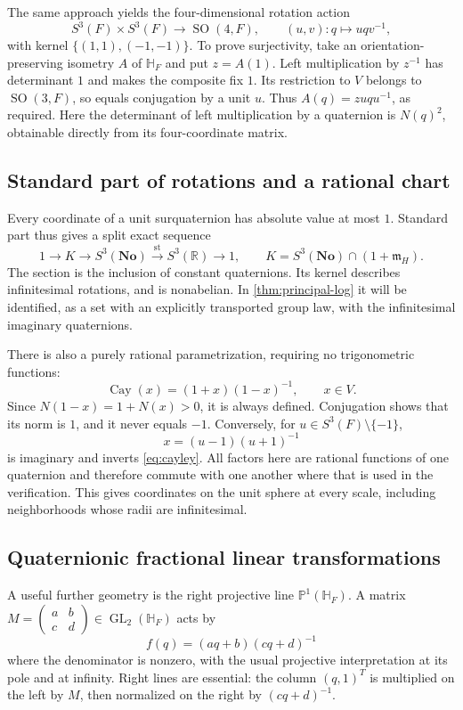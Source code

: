 \documentclass[11pt,letterpaper]{article}
\numberwithin{equation}{section}
\theoremstyle{definition}
\theoremstyle{remark}
\newcommand{\No}{\mathbf{No}}
\newcommand{\HF}{\mathbb H_F}
\newcommand{\R}{\mathbb R}
\newcommand{\mm}{\mathfrak m}
\newcommand{\st}{\operatorname{st}}
\newcommand{\GL}{\operatorname{GL}}
\newcommand{\SO}{\operatorname{SO}}
\begin{document}
The same approach yields the four-dimensional rotation action
\begin{equation}\label{eq:spin4}
 S^3(F)\times S^3(F)\longrightarrow\SO(4,F),\qquad
 (u,v):q\longmapsto uqv^{-1},
\end{equation}
with kernel $\{(1,1),(-1,-1)\}$. To prove surjectivity, take an orientation-preserving
isometry $A$ of $\HF$ and put $z=A(1)$. Left multiplication by $z^{-1}$ has determinant $1$
and makes the composite fix $1$. Its restriction to $V$ belongs to $\SO(3,F)$, so equals
conjugation by a unit $u$. Thus $A(q)=zuqu^{-1}$, as required. Here the determinant of left
multiplication by a quaternion is $N(q)^2$, obtainable directly from its four-coordinate
matrix.

\subsection{Standard part of rotations and a rational chart}
Every coordinate of a unit surquaternion has absolute value at most $1$. Standard part thus
gives a split exact sequence
\begin{equation}\label{eq:unitsreduction}
 1\longrightarrow K\longrightarrow S^3(\No)
 \xrightarrow{\st} S^3(\R)\longrightarrow1,
 \qquad K=S^3(\No)\cap(1+\mm_H).
\end{equation}
The section is the inclusion of constant quaternions. Its kernel describes infinitesimal
rotations, and is nonabelian. In \cref{thm:principal-log} it will be identified, as a set with
an explicitly transported group law, with the infinitesimal imaginary quaternions.

There is also a purely rational parametrization, requiring no trigonometric functions:
\begin{equation}\label{eq:cayley}
 \operatorname{Cay}(x)=(1+x)(1-x)^{-1},\qquad x\in V.
\end{equation}
Since $N(1-x)=1+N(x)>0$, it is always defined. Conjugation shows that its norm is $1$, and
it never equals $-1$. Conversely, for $u\in S^3(F)\setminus\{-1\}$,
\[
 x=(u-1)(u+1)^{-1}
\]
is imaginary and inverts \eqref{eq:cayley}. All factors here are rational functions of one
quaternion and therefore commute with one another where that is used in the verification.
This gives coordinates on the unit sphere at every scale, including neighborhoods whose
radii are infinitesimal.

\subsection{Quaternionic fractional linear transformations}
A useful further geometry is the right projective line $\mathbb P^1(\HF)$. A matrix
$M=\left(\begin{smallmatrix}a&b\\c&d\end{smallmatrix}\right)\in\GL_2(\HF)$ acts by
\begin{equation}\label{eq:mobius}
 f(q)=(aq+b)(cq+d)^{-1}
\end{equation}
where the denominator is nonzero, with the usual projective interpretation at its pole and at
infinity. Right lines are essential: the column $(q,1)^T$ is multiplied on the left by $M$,
then normalized on the right by $(cq+d)^{-1}$.
\end{document}
